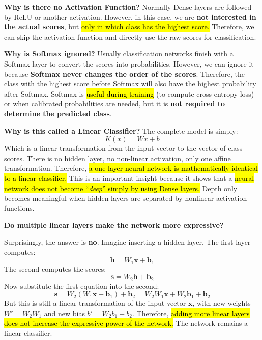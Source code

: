\highspace
\textcolor{Green3}{ \textbf{Why is there no Activation Function?}} Normally Dense layers are followed by ReLU or another activation. However, in this case, we are \textbf{not interested in the actual scores}, but \hl{only in which class has the highest score.} Therefore, we can skip the activation function and directly use the raw scores for classification.

\highspace
\textcolor{Green3}{ \textbf{Why is Softmax ignored?}}\label{sec:softmax-ignored} Usually classification networks finish with a Softmax layer to convert the scores into probabilities. However, we can ignore it because \textbf{Softmax never changes the order of the scores}. Therefore, the class with the highest score before Softmax will also have the highest probability after Softmax. Softmax is \hl{useful during training} (to compute cross-entropy loss) or when calibrated probabilities are needed, but it is \textbf{not required to determine the predicted class}.

\highspace
\textcolor{Green3}{ \textbf{Why is this called a Linear Classifier?}} The complete model is simply:
\begin{equation}
    K\left(x\right) = Wx + b
\end{equation}
Which is a linear transformation from the input vector to the vector of class scores. There is no hidden layer, no non-linear activation, only one affine transformation. Therefore, \hl{a one-layer neural network is mathematically identical to a linear classifier.} This is an important insight because it shows that a \hl{neural network does not become ``\emph{deep}'' simply by using Dense layers.} Depth only becomes meaningful when hidden layers are separated by nonlinear activation functions.

\highspace
\begin{flushleft}
    \textcolor{Green3}{ \textbf{Do multiple linear layers make the network more expressive?}}
\end{flushleft}
Surprisingly, the answer is \textbf{no}. Imagine inserting a hidden layer. The first layer computes:
\begin{equation*}
    \mathbf{h} = W_1 \mathbf{x} + \mathbf{b}_1
\end{equation*}
The second computes the scores:
\begin{equation*}
    \mathbf{s} = W_2 \mathbf{h} + \mathbf{b}_2
\end{equation*}
Now substitute the first equation into the second:
\begin{equation*}
    \mathbf{s} = W_2 \left(W_1 \mathbf{x} + \mathbf{b}_1\right) + \mathbf{b}_2 = W_2 W_1 \mathbf{x} + W_2 \mathbf{b}_1 + \mathbf{b}_2
\end{equation*}
But this is still a linear transformation of the input vector $\mathbf{x}$, with new weights $W' = W_2 W_1$ and new bias $b' = W_2 b_1 + b_2$. Therefore, \hl{adding more linear layers does not increase the expressive power of the network.} The network remains a linear classifier.

